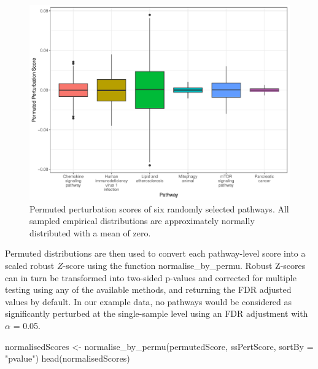 \documentclass[9pt,a4paper,]{extarticle}
\newenvironment{Shaded}{\begin{snugshade}}{\end{snugshade}}
\newcommand{\AttributeTok}[1]{\textcolor[rgb]{0.77,0.63,0.00}{#1}}
\newcommand{\FunctionTok}[1]{\textcolor[rgb]{0.00,0.00,0.00}{#1}}
\newcommand{\NormalTok}[1]{#1}
\newcommand{\OtherTok}[1]{\textcolor[rgb]{0.56,0.35,0.01}{#1}}
\newcommand{\StringTok}[1]{\textcolor[rgb]{0.31,0.60,0.02}{#1}}
\begin{document}
\begin{figure}

{\centering \includegraphics[width=1\linewidth]{sSNAPPY_paper_files/figure-latex/Figure1-1} 

}

\caption{Permuted perturbation scores of six randomly selected pathways. All sampled empirical distributions are approximately normally distributed with a mean of zero.}\label{fig:Figure1}
\end{figure}

Permuted distributions are then used to convert each pathway-level score into a scaled robust \(Z\)-score using the function normalise\_by\_permu.
Robust Z-scores can in turn be transformed into two-sided p-values and corrected for multiple testing using any of the available methods, and returning the FDR adjusted values by default.
In our example data, no pathways would be considered as significantly perturbed at the single-sample level using an FDR adjustment with \(\alpha\) = 0.05.

\begin{Shaded}
\begin{Highlighting}[]
\NormalTok{normalisedScores }\OtherTok{\textless{}{-}} \FunctionTok{normalise\_by\_permu}\NormalTok{(permutedScore, ssPertScore, }
                                       \AttributeTok{sortBy =} \StringTok{"pvalue"}\NormalTok{)}
\FunctionTok{head}\NormalTok{(normalisedScores)}
\end{Highlighting}
\end{Shaded}
\end{document}
